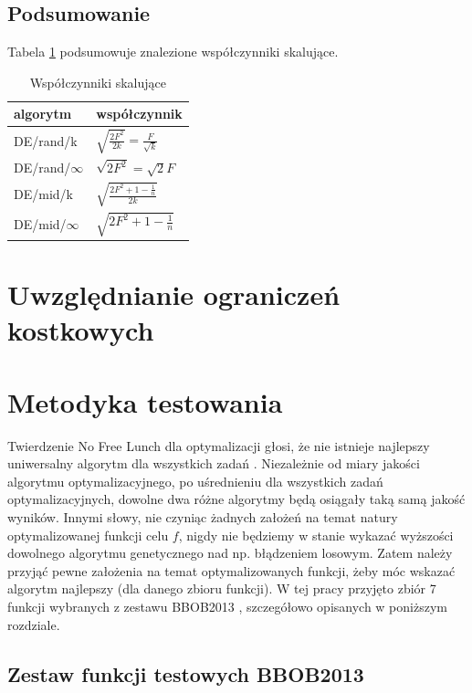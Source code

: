 \documentclass[a4paper,onecolumn,oneside,11pt,wide,floatssmall]{mwrep}
\theoremstyle{definition}
\theoremstyle{plain}%
\theoremstyle{remark}
\begin{document}
\section{Podsumowanie}

Tabela \ref{table:wspolczynniki} podsumowuje znalezione współczynniki skalujące.

\begin{table}[H]
\centering
\begin{tabular}{ l | l }
algorytm         & współczynnik \\ \hline
DE/rand/k        & $\sqrt{\frac{2F^2}{2k}} = \frac{F}{\sqrt{k}}$ \\ 
DE/rand/$\infty$ & $\sqrt{2F^2} = \sqrt{2}F$ \\ \hline
DE/mid/k         & $\sqrt{\frac{2F^2 + 1 - \frac{1}{n}}{2k}}$ \\
DE/mid/$\infty$  & $\sqrt{2F^2 + 1 - \frac{1}{n}}$ \\
\end{tabular}
\caption{Współczynniki skalujące}
\label{table:wspolczynniki}
\end{table}

\chapter{Uwzględnianie ograniczeń kostkowych}

\cite{boundary}

\chapter{Metodyka testowania}

Twierdzenie No Free Lunch dla optymalizacji głosi, że nie istnieje najlepszy uniwersalny algorytm dla wszystkich zadań \cite{lunch}. 
Niezależnie od miary jakości algorytmu optymalizacyjnego, po uśrednieniu dla wszystkich zadań optymalizacyjnych, 
dowolne dwa różne algorytmy będą osiągały taką samą jakość wyników. Innymi słowy,
nie czyniąc żadnych założeń na temat natury optymalizowanej funkcji celu $f$, 
nigdy nie będziemy w stanie wykazać wyższości dowolnego algorytmu genetycznego nad np. błądzeniem losowym. 
Zatem należy przyjąć pewne założenia na temat optymalizowanych funkcji, żeby móc wskazać algorytm najlepszy (dla danego zbioru funkcji).
W tej pracy przyjęto zbiór 7 funkcji wybranych z zestawu BBOB2013 \cite{noiseless}, szczegółowo opisanych w poniższym rozdziale.

\section{Zestaw funkcji testowych BBOB2013}
\label{sec:zestaw}
\end{document}
